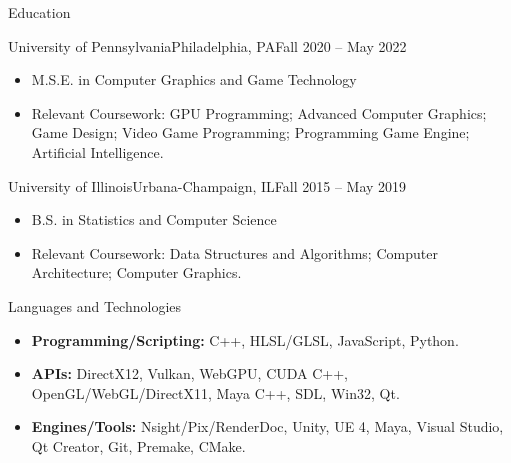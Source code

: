 \documentclass[]{mcdowellcv}
\begin{document}
	\makeheader
	

	\begin{cvsection}{Education}
		\begin{cvsubsection}{University of Pennsylvania}{Philadelphia, PA}{Fall 2020 -- May 2022}
			\begin{itemize}
				\item M.S.E. in Computer Graphics and Game Technology
				\item Relevant Coursework: GPU Programming; Advanced Computer Graphics; Game Design; Video Game Programming; Programming Game Engine; Artificial Intelligence.
			\end{itemize}
		\end{cvsubsection}
		\begin{cvsubsection}{University of Illinois}{Urbana-Champaign, IL}{Fall 2015 -- May 2019}
			\begin{itemize}
				\item B.S. in Statistics and Computer Science
				\item Relevant Coursework: Data Structures and Algorithms; Computer Architecture; Computer Graphics.
			\end{itemize}
		\end{cvsubsection}
	\end{cvsection}

	\begin{cvsection}{Languages and Technologies}
		\begin{cvsubsection}{}{}{}	
			\begin{itemize}
				\item \textbf{Programming/Scripting:} C++, HLSL/GLSL, JavaScript, Python.
				\item \textbf{APIs:} DirectX12, Vulkan, WebGPU, CUDA C++, OpenGL/WebGL/DirectX11, Maya C++, SDL, Win32, Qt. 
				\item \textbf{Engines/Tools:} Nsight/Pix/RenderDoc, Unity, UE 4, Maya, Visual Studio, Qt Creator, Git, Premake, CMake.
			\end{itemize}
		\end{cvsubsection}
	\end{cvsection}
	
\end{document}
